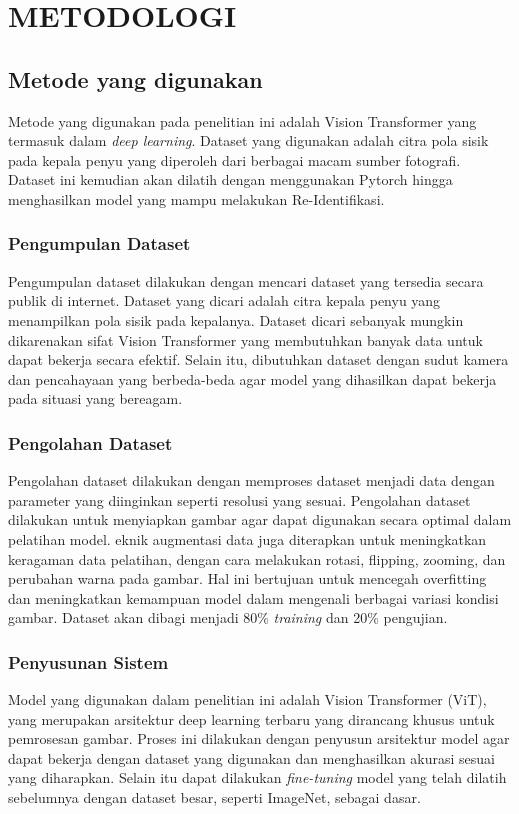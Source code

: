 \chapter{METODOLOGI}


\section{Metode yang digunakan}
Metode yang digunakan pada penelitian ini adalah Vision Transformer yang termasuk dalam \textit{deep learning}.
Dataset yang digunakan adalah citra pola sisik pada kepala penyu yang diperoleh dari berbagai macam sumber fotografi.
Dataset ini kemudian akan dilatih dengan menggunakan Pytorch hingga menghasilkan model yang mampu melakukan Re-Identifikasi.

\subsection{Pengumpulan Dataset}
Pengumpulan dataset dilakukan dengan mencari dataset yang tersedia secara publik di internet. 
Dataset yang dicari adalah citra kepala penyu yang menampilkan pola sisik pada kepalanya.
Dataset dicari sebanyak mungkin dikarenakan sifat Vision Transformer yang membutuhkan banyak data untuk dapat bekerja secara efektif.
Selain itu, dibutuhkan dataset dengan sudut kamera dan pencahayaan yang berbeda-beda agar model yang dihasilkan dapat bekerja pada situasi yang bereagam.

\subsection{Pengolahan Dataset}
Pengolahan dataset dilakukan dengan memproses dataset menjadi data dengan parameter yang diinginkan seperti resolusi yang sesuai.
Pengolahan dataset dilakukan untuk menyiapkan gambar agar dapat digunakan secara optimal dalam pelatihan model.
eknik augmentasi data juga diterapkan untuk meningkatkan keragaman data pelatihan, dengan cara melakukan rotasi, flipping, zooming, dan perubahan warna pada gambar. 
Hal ini bertujuan untuk mencegah overfitting dan meningkatkan kemampuan model dalam mengenali berbagai variasi kondisi gambar.
Dataset akan dibagi menjadi 80\% \textit{training} dan 20\% pengujian.

\subsection{Penyusunan Sistem}
Model yang digunakan dalam penelitian ini adalah Vision Transformer (ViT), yang merupakan arsitektur deep learning terbaru yang dirancang khusus untuk pemrosesan gambar.
Proses ini dilakukan dengan penyusun arsitektur model agar dapat bekerja dengan dataset yang digunakan dan menghasilkan akurasi sesuai yang diharapkan.
Selain itu dapat dilakukan \textit{fine-tuning} model yang telah dilatih sebelumnya dengan dataset besar, seperti ImageNet, sebagai dasar.

